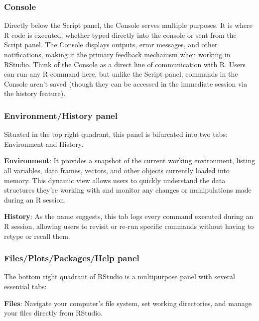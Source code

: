 \documentclass[
  b5paper]{book}
\begin{document}
\hypertarget{console}{%
\subsubsection*{Console}\label{console}}

Directly below the Script panel, the Console serves multiple purposes. It is where R code is executed, whether typed directly into the console or sent from the Script panel. The Console displays outputs, error messages, and other notifications, making it the primary feedback mechanism when working in RStudio. Think of the Console as a direct line of communication with R. Users can run any R command here, but unlike the Script panel, commands in the Console aren't saved (though they can be accessed in the immediate session via the history feature).

\hypertarget{environmenthistory-panel}{%
\subsubsection*{Environment/History panel}\label{environmenthistory-panel}}

Situated in the top right quadrant, this panel is bifurcated into two tabs: Environment and History.

\textbf{Environment}: It provides a snapshot of the current working environment, listing all variables, data frames, vectors, and other objects currently loaded into memory. This dynamic view allows users to quickly understand the data structures they're working with and monitor any changes or manipulations made during an R session.

\textbf{History}: As the name suggests, this tab logs every command executed during an R session, allowing users to revisit or re-run specific commands without having to retype or recall them.

\hypertarget{filesplotspackageshelp-panel}{%
\subsubsection*{Files/Plots/Packages/Help panel}\label{filesplotspackageshelp-panel}}

The bottom right quadrant of RStudio is a multipurpose panel with several essential tabs:

\textbf{Files}: Navigate your computer's file system, set working directories, and manage your files directly from RStudio.
\end{document}
